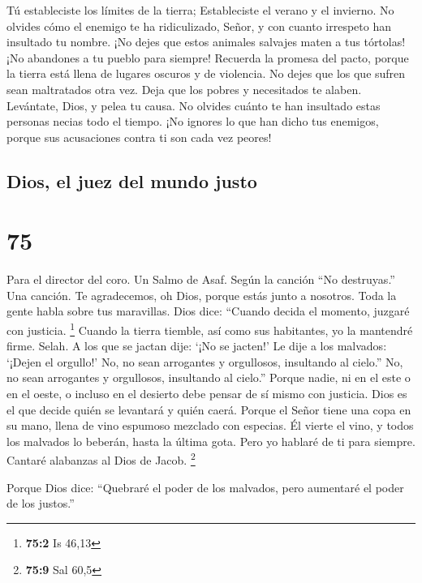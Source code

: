  Tú estableciste los límites de la tierra; Estableciste el
verano y el invierno.  No olvides cómo el enemigo te ha
ridiculizado, Señor, y con cuanto irrespeto han insultado tu nombre.
 ¡No dejes que estos animales salvajes maten a tus
tórtolas! ¡No abandones a tu pueblo para siempre!  Recuerda
la promesa del pacto, porque la tierra está llena de lugares oscuros y
de violencia.  No dejes que los que sufren sean maltratados
otra vez. Deja que los pobres y necesitados te alaben. 
Levántate, Dios, y pelea tu causa. No olvides cuánto te han insultado
estas personas necias todo el tiempo.  ¡No ignores lo que
han dicho tus enemigos, porque sus acusaciones contra ti son cada vez
peores!

\hypertarget{dios-el-juez-del-mundo-justo}{%
\subsection{Dios, el juez del mundo
justo}\label{dios-el-juez-del-mundo-justo}}

\hypertarget{section-74}{%
\section{75}\label{section-74}}

Para el director del coro. Un Salmo de Asaf. Según la canción ``No
destruyas.'' Una canción.  Te agradecemos, oh Dios, porque
estás junto a nosotros. Toda la gente habla sobre tus maravillas.
 Dios dice: ``Cuando decida el momento, juzgaré con
justicia. \footnote{\textbf{75:2} Is 46,13}  Cuando la
tierra tiemble, así como sus habitantes, yo la mantendré firme. Selah.
 A los que se jactan dije: `¡No se jacten!' Le dije a los
malvados: `¡Dejen el orgullo!'  No, no sean arrogantes y
orgullosos, insultando al cielo.'' No, no sean arrogantes y orgullosos,
insultando al cielo.''  Porque nadie, ni en el este o en el
oeste, o incluso en el desierto debe pensar de sí mismo con justicia.
 Dios es el que decide quién se levantará y quién caerá.
 Porque el Señor tiene una copa en su mano, llena de vino
espumoso mezclado con especias. Él vierte el vino, y todos los malvados
lo beberán, hasta la última gota.  Pero yo hablaré de ti
para siempre. Cantaré alabanzas al Dios de Jacob. \footnote{\textbf{75:9}
  Sal 60,5}

 Porque Dios dice: ``Quebraré el poder de los malvados,
pero aumentaré el poder de los justos.''

